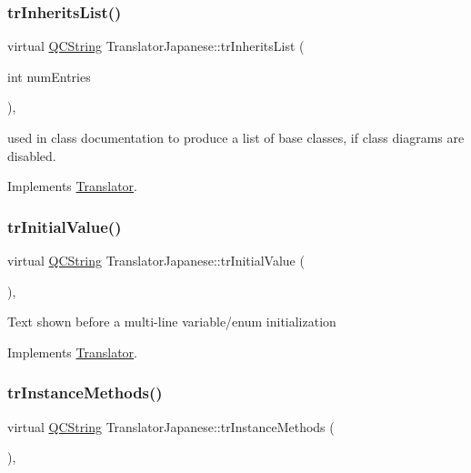 \subsubsection{\texorpdfstring{trInheritsList()}{trInheritsList()}}
{\footnotesize\ttfamily virtual \mbox{\hyperlink{class_q_c_string}{Q\+C\+String}} Translator\+Japanese\+::tr\+Inherits\+List (\begin{DoxyParamCaption}\item[{int}]{num\+Entries }\end{DoxyParamCaption})\hspace{0.3cm}{\ttfamily [inline]}, {\ttfamily [virtual]}}

used in class documentation to produce a list of base classes, if class diagrams are disabled. 

Implements \mbox{\hyperlink{class_translator}{Translator}}.

\mbox{\label{class_translator_japanese_af932b07c746cf4b8a41ba1a0bccd0a4a}} 
\subsubsection{\texorpdfstring{trInitialValue()}{trInitialValue()}}
{\footnotesize\ttfamily virtual \mbox{\hyperlink{class_q_c_string}{Q\+C\+String}} Translator\+Japanese\+::tr\+Initial\+Value (\begin{DoxyParamCaption}{ }\end{DoxyParamCaption})\hspace{0.3cm}{\ttfamily [inline]}, {\ttfamily [virtual]}}

Text shown before a multi-\/line variable/enum initialization 

Implements \mbox{\hyperlink{class_translator}{Translator}}.

\mbox{\label{class_translator_japanese_a59790428299178e856eedbfab9117ebc}} 
\subsubsection{\texorpdfstring{trInstanceMethods()}{trInstanceMethods()}}
{\footnotesize\ttfamily virtual \mbox{\hyperlink{class_q_c_string}{Q\+C\+String}} Translator\+Japanese\+::tr\+Instance\+Methods (\begin{DoxyParamCaption}{ }\end{DoxyParamCaption})\hspace{0.3cm}{\ttfamily [inline]}, {\ttfamily [virtual]}}

